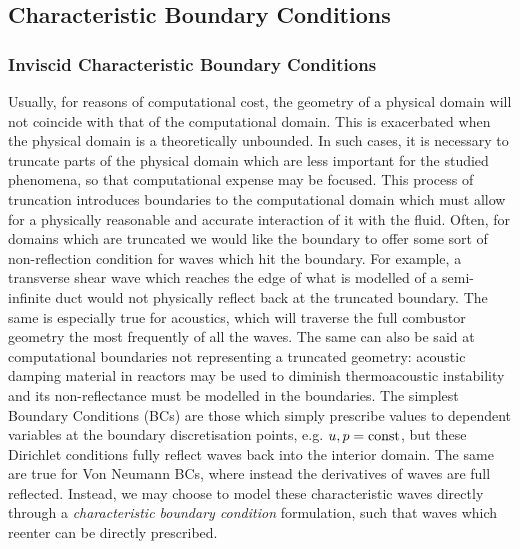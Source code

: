 \subsection{Characteristic Boundary Conditions}

\subsubsection{Inviscid Characteristic Boundary Conditions}

Usually, for reasons of computational cost, the geometry of a physical domain will not coincide with that of the computational domain. This is exacerbated when the physical domain is a theoretically unbounded. In such cases, it is necessary to truncate parts of the physical domain which are less important for the studied phenomena, so that computational expense may be focused. This process of truncation introduces boundaries to the computational domain which must allow for a physically reasonable and accurate interaction of it with the fluid. Often, for domains which are truncated we would like the boundary to offer some sort of non-reflection condition for waves which hit the boundary. For example, a transverse shear wave which reaches the edge of what is modelled of a semi-infinite duct would not physically reflect back at the truncated boundary. The same is especially true for acoustics, which will traverse the full combustor geometry the most frequently of all the waves. The same can also be said at computational boundaries not representing a truncated geometry: acoustic damping material in reactors may be used to diminish thermoacoustic instability and its non-reflectance must be modelled in the boundaries. The simplest Boundary Conditions (BCs) are those which simply prescribe values to dependent variables at the boundary discretisation points, e.g. $u, p = \rm {const}$, but these Dirichlet conditions fully reflect waves back into the interior domain. The same are true for Von Neumann BCs, where instead the derivatives of waves are full reflected. Instead, we may choose to model these characteristic waves directly through a \emph{characteristic boundary condition} formulation, such that waves which reenter can be directly prescribed.


